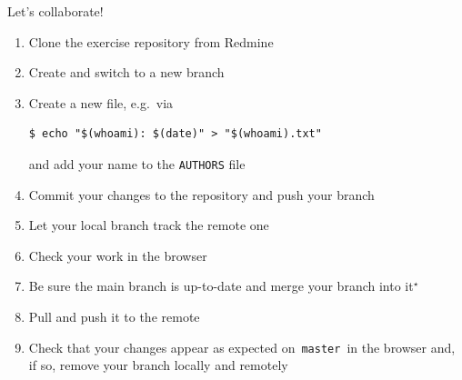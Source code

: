 \documentclass[usenames,svgnames,14pt]{beamer}
\newcommand{\then}{\raisebox{2pt}{$\;\drsh\;$}}
\begin{document}
\begin{frame}[fragile]{Let's collaborate!}
    \small
    \setlength{\leftmargini}{5mm}
    \begin{enumerate}
        \setlength{\itemsep}{-1mm}
        \item Clone the exercise repository from Redmine\\
              \then {}
        \item Create and switch to a new branch
        \item Create a new file, e.g.\ via
              \begin{lstlisting}[style=MyBash, xleftmargin=3mm, xrightmargin=28mm, belowskip=-9mm, aboveskip=2mm]
                  $ echo "$(whoami): $(date)" > "$(whoami).txt"
              \end{lstlisting}
              and add your name to the \texttt{AUTHORS} file
        \item Commit your changes to the repository and push your branch
        \item Let your local branch track the remote one
        \item Check your work in the browser
        \item Be sure the main branch is up-to-date and merge your branch into it$^\star$
        \item Pull and push it to the remote
        \item Check that your changes appear as expected on \,\texttt{master}\, in the browser and, if so, remove your branch locally and remotely
    \end{enumerate}
\end{frame}

\end{document}

